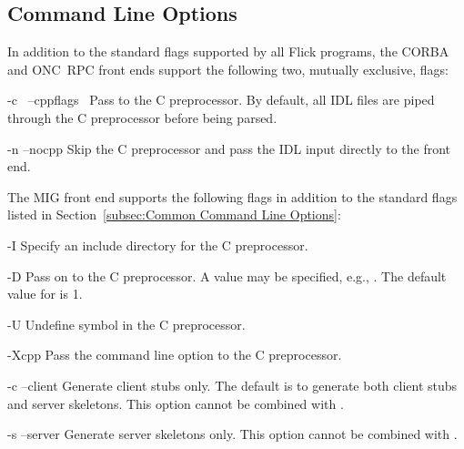 

\subsection{Command Line Options}
\label{subsec:FE:Command Line Options}

In addition to the standard flags supported by all Flick programs, the CORBA
and ONC~RPC front ends support the following two, mutually exclusive, flags:

\begin{optionlist}
  \item[-c~\optionarg{flags} \oroption{} --cppflags~\optionarg{flags}]
  Pass  to the C preprocessor.  By default, all IDL files are
  piped through the C preprocessor before being parsed.

  \item[-n \oroption{} --nocpp]
  Skip the C preprocessor and pass the IDL input directly to the front end.
\end{optionlist}

The MIG front end supports the following flags in addition to the standard
flags listed in Section~\ref{subsec:Common Command Line Options}:

\begin{optionlist}
  \item[-I\optionarg{dir}]
  Specify an include directory for the C preprocessor.

  \item[-D\optionarg{sym}]
  Pass  on to the C preprocessor.  A value may be specified,
  e.g., \@.  The default value for  is 1.

  \item[-U\optionarg{sym}]
  Undefine symbol  in the C preprocessor.

  \item[-Xcpp \optionarg{opt}]
  Pass the command line option  to the C preprocessor.

  \item[-c \oroption{} --client]
  Generate client stubs only.  The default is to generate both client stubs and
  server skeletons.  This option cannot be combined with .

  \item[-s \oroption{} --server]
  Generate server skeletons only.  This option cannot be combined with
  .
\end{optionlist}

